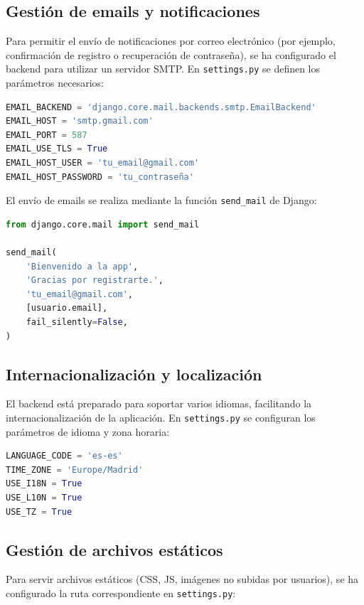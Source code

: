 \subsection{Gestión de emails y notificaciones}

Para permitir el envío de notificaciones por correo electrónico (por ejemplo, confirmación de registro o recuperación de contraseña), se ha configurado el backend para utilizar un servidor SMTP. En \texttt{settings.py} se definen los parámetros necesarios:

\begin{lstlisting}[language=Python, caption={Configuración de email en settings.py}]
EMAIL_BACKEND = 'django.core.mail.backends.smtp.EmailBackend'
EMAIL_HOST = 'smtp.gmail.com'
EMAIL_PORT = 587
EMAIL_USE_TLS = True
EMAIL_HOST_USER = 'tu_email@gmail.com'
EMAIL_HOST_PASSWORD = 'tu_contraseña'
\end{lstlisting}

El envío de emails se realiza mediante la función \texttt{send\_mail} de Django:

\begin{lstlisting}[language=Python, caption={Ejemplo de envío de email}]
from django.core.mail import send_mail

send_mail(
    'Bienvenido a la app',
    'Gracias por registrarte.',
    'tu_email@gmail.com',
    [usuario.email],
    fail_silently=False,
)
\end{lstlisting}

\subsection{Internacionalización y localización}

El backend está preparado para soportar varios idiomas, facilitando la internacionalización de la aplicación. En \texttt{settings.py} se configuran los parámetros de idioma y zona horaria:

\begin{lstlisting}[language=Python, caption={Internacionalización en settings.py}]
LANGUAGE_CODE = 'es-es'
TIME_ZONE = 'Europe/Madrid'
USE_I18N = True
USE_L10N = True
USE_TZ = True
\end{lstlisting}

\subsection{Gestión de archivos estáticos}

Para servir archivos estáticos (CSS, JS, imágenes no subidas por usuarios), se ha configurado la ruta correspondiente en \texttt{settings.py}:

